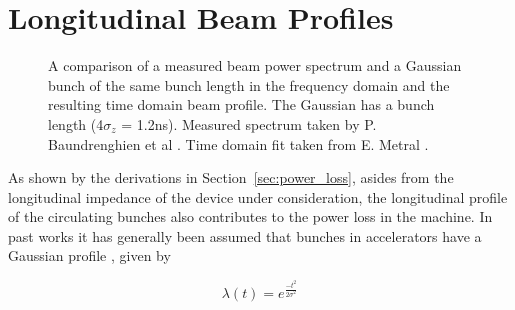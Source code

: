 \documentclass{cernyrep}
\begin{document}
\section{Longitudinal Beam Profiles}

\begin{figure}
\caption{A comparison of  a measured beam power spectrum and a Gaussian bunch of the same bunch length in the frequency domain and  the resulting time domain beam profile. The Gaussian has a bunch length (4$\sigma_{z}$ = 1.2ns). Measured spectrum taken by P. Baundrenghien et al \cite{Baudrenghien:LHCPowSpec}. Time domain fit taken from E. Metral \cite{Metral:Heating}.}
\label{fig:measured_gauss}
\end{figure}

As shown by the derivations in Section~\ref{sec:power_loss}, asides from the longitudinal impedance of the device under consideration, the longitudinal profile of the circulating bunches also contributes to the power loss in the machine. In past works it has generally been assumed that bunches in accelerators have a Gaussian profile \cite{Grudiev:LongTransSecCol}, given by

\begin{equation}
\lambda \left( t \right) = e^{\frac{-t^{2}}{2\sigma^{2}}}
\label{eqn:gauss}
\end{equation}
\end{document}
